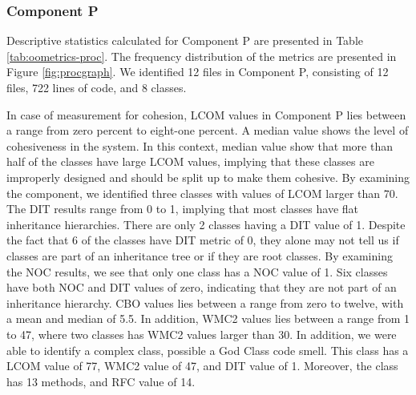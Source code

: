 \subsubsection{Component P}
Descriptive statistics calculated for Component P are presented in Table \ref{tab:oometrics-proc}. The frequency distribution of the metrics are presented in Figure \ref{fig:procgraph}. We identified 12 files in Component P, consisting of 12 files, 722 lines of code, and 8 classes.

In case of measurement for cohesion, LCOM values in Component P lies between a range from zero percent to eight-one percent. A median value shows the level of cohesiveness in the system. In this context, median value show that more than half of the classes have large LCOM values, implying that these classes are improperly designed and should be split up to make them cohesive. By examining the component, we identified three classes with values of LCOM larger than 70. The DIT results range from 0 to 1, implying that most classes have flat inheritance hierarchies. There are only 2 classes having a DIT value of 1. Despite the fact that 6 of the classes have DIT metric of 0, they alone may not tell us if classes are part of an inheritance tree or if they are root classes. By examining the NOC results, we see that only one class has a NOC value of 1. Six classes have both NOC and DIT values of zero, indicating that they are not part of an inheritance hierarchy. CBO values lies between a range from zero to twelve, with a mean and median of 5.5. In addition, WMC2 values lies between a range from 1 to 47, where two classes has WMC2 values larger than 30. In addition, we were able to identify a complex class, possible a God Class code smell. This class has a LCOM value of 77, WMC2 value of 47, and DIT value of 1. Moreover, the class has 13 methods, and RFC value of 14.


